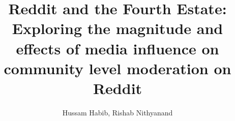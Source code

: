 \documentclass[letterpaper]{article} %
\title{Reddit and the Fourth Estate: \\ Exploring the magnitude and effects of media influence on community level moderation on Reddit}
\author {
     Hussam Habib,
     Rishab Nithyanand \\
 }
\begin{document}
\maketitle

\sloppy



%





\balance




\end{document}
